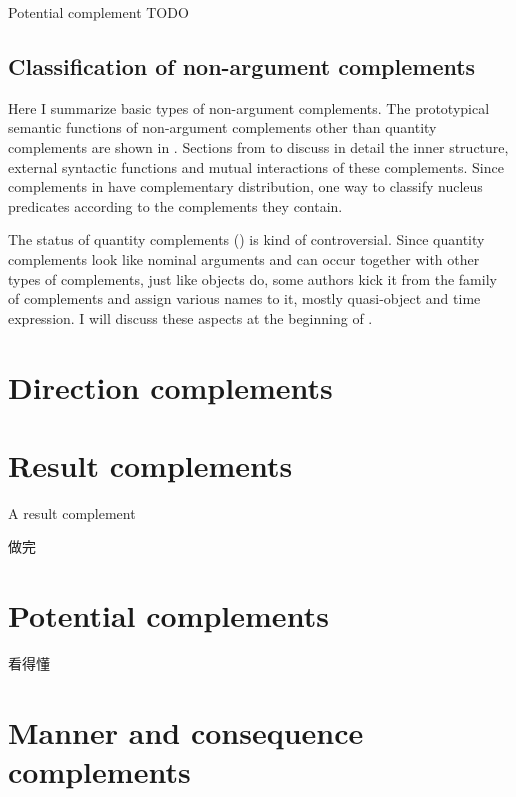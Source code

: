 \documentclass[../main.tex]{subfiles}
\begin{document}
Potential complement TODO

\subsection{Classification of non-argument complements}\label{sec:complement-classification}

Here I summarize basic types of non-argument complements. The prototypical semantic functions of 
non-argument complements other than quantity complements are shown in .
Sections from  to  discuss in 
detail the inner structure, external syntactic functions and mutual interactions of these 
complements. Since complements in  have complementary distribution,
one way to classify nucleus predicates according to the complements they contain. 

The status of quantity complements () is kind of controversial.
Since quantity complements look like nominal arguments and can occur together with other types of 
complements, just like objects do, some authors kick it from the family of complements and 
assign various names to it, mostly quasi-object and time expression. I will discuss these aspects 
at the beginning of .



\section{Direction complements}\label{sec:direction-complement}

\section{Result complements}\label{sec:result-complement}

A result complement 

做完

\section{Potential complements}\label{sec:potential-complement}

看得懂

\section{Manner and consequence complements}\label{sec:manner-consequence-complement}
\end{document}
